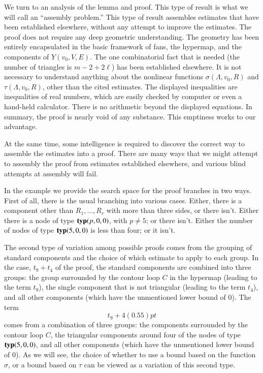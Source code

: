 We turn to an analysis of the lemma and proof.  This type of result is what
we will call an ``assembly problem.''  This type of result
assembles estimates that have been established elsewhere, without
any attempt to improve the estimates.  The proof
does not require any deep geometric understanding.  The geometry
has been entirely encapsulated in the basic framework of
fans, the hypermap, and the components
of $Y(v_0,V,E)$.  The one combinatorial fact that is needed
(the number of triangles is $m-2+2\ell$) 
has been established elsewhere.  It is not necessary
to understand anything about the nonlinear functions $\sigma(\Lambda,v_0,R)$
and $\tau(\Lambda,v_0,R)$, other than the cited estimates.   
The displayed inequalities are inequalities of real numbers,
which are easily checked by computer
or even a hand-held calculator.  There is no arithmetic beyond
the displayed equations.
In summary,
the proof is nearly void of any substance.   This emptiness
works to our advantage.

At the same time, some intelligence is required to discover the
correct way to assemble the estimates into a proof.   There are
many ways that we might attempt to assembly the proof from estimates
established elsewhere, and various blind attempts at assembly will
fail.  

In the example we provide the search space for the proof
branches in two ways.  First of all, there is the usual branching
into various cases.  Either, there is a component other than
$R_1,\ldots,R_r$ with more than three sides, or there isn't.
Either there is a node of type ${\operatorname{\bf typ}}{(p,0,0)}$, with $p\ne 5$; or there isn't.
Either the number of nodes of type ${\operatorname{\bf typ}}{(5,0,0)}$ is less than four; or it isn't.

The second type of variation among possible proofs comes from
the grouping of standard components and the choice of which estimate
to apply to each group.  In the case, $t_9+t_4$ of the proof, the
standard components are combined into three groups:
the group surrounded by the contour loop $C$ in the hypermap
(leading to the term $t_9$), the single component that is not triangular
(leading to the term $t_4$), and all other components (which have
the unmentioned lower bound of $0$).  The term
   $$
   t_9 + 4(0.55)pt 
   $$
comes from a combination of three groups:
the components surrounded by the contour loop $C$, the triangular
components around four of the nodes of type ${\operatorname{\bf typ}}{(5,0,0)}$, and all other
components (which have the unmentioned lower bound of $0$).
As we will see, the choice of whether to use a bound based on
the function $\sigma$, or a bound based on $\tau$ can be
viewed as a variation of this second type.

